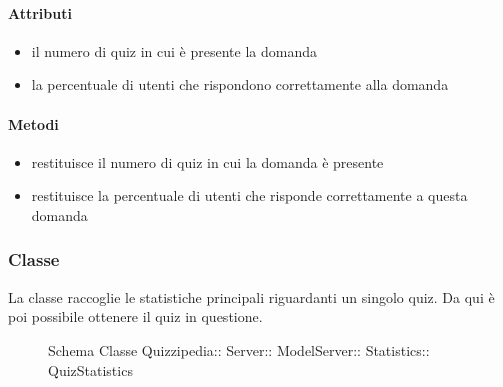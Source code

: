 \paragraph{Attributi}
\begin{itemize}
\item {}
\newline
il numero di quiz in cui è presente la domanda
\item {}
\newline
la percentuale di utenti che rispondono correttamente alla domanda
\end{itemize}
\paragraph{Metodi}
\begin{itemize}
\item {}
\newline
restituisce il numero di quiz in cui la domanda è presente
\newline
\item {}
\newline
restituisce la percentuale di utenti che risponde correttamente a questa domanda
\newline
\end{itemize}
\subsubsection{Classe }
La classe raccoglie le statistiche principali riguardanti un singolo quiz. Da qui è poi possibile ottenere il quiz in questione.
\begin{figure}[H]
\centering
\noindent{}
\caption[Schema Classe QuizStatistics]{Schema Classe Quizzipedia:: Server:: ModelServer:: Statistics:: QuizStatistics}
\end{figure}
